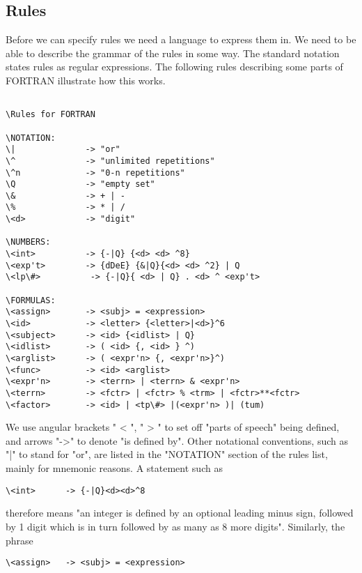 \subsection{Rules}

Before we can specify rules we need a language to express them in. We need to be able to describe the grammar of the rules in some way. The standard notation states rules as regular expressions. The following rules describing some parts of FORTRAN illustrate how this works.

\begin{verbatim}

\Rules for FORTRAN

\NOTATION:
\|              -> "or"
\^              -> "unlimited repetitions"
\^n             -> "0-n repetitions"
\Q              -> "empty set"
\&              -> + | -
\%              -> * | /
\<d>            -> "digit"

\NUMBERS:
\<int>          -> {-|Q} {<d> <d> ^8}
\<exp't>        -> {dDeE} {&|Q}{<d> <d> ^2} | Q
\<lp\#>          -> {-|Q}{ <d> | Q} . <d> ^ <exp't>

\FORMULAS:
\<assign>       -> <subj> = <expression>
\<id>           -> <letter> {<letter>|<d>}^6
\<subject>      -> <id> {<idlist> | Q}
\<idlist>       -> ( <id> {, <id> } ^)
\<arglist>      -> ( <expr'n> {, <expr'n>}^)
\<func>         -> <id> <arglist>
\<expr'n>       -> <terrn> | <terrn> & <expr'n>
\<terrn>        -> <fctr> | <fctr> % <trm> | <fctr>**<fctr>
\<factor>       -> <id> | <tp\#> |(<expr'n> )| (tum)

\end{verbatim}

We use angular brackets " < ", " > " to set off "parts of speech" being defined, and arrows "->" to denote "is defined by". Other notational conventions, such as "|" to stand for "or", are listed in the "NOTATION" section of the rules list, mainly for mnemonic reasons. A statement such as

\begin{verbatim}
\<int>      -> {-|Q}<d><d>^8
\end{verbatim}

therefore means "an integer is defined by an optional leading minus sign, followed by 1 digit which is in turn followed by as many as 8 more digits". Similarly, the phrase

\begin{verbatim}
\<assign>   -> <subj> = <expression>
\end{verbatim}

